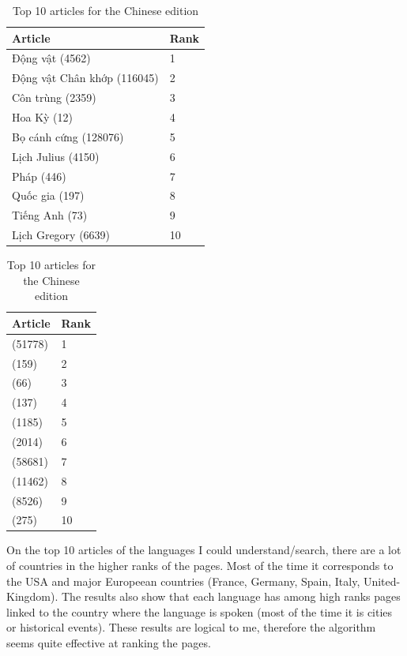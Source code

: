 \begin{table}[htbp]
    \begin{minipage}{.45\linewidth}
        \centering
        \begin{tabular}{ll}
            \toprule
            Article & Rank\\
            \midrule
            Động vật (4562) & 1\\
            Động vật Chân khớp (116045) & 2\\
            Côn trùng (2359) & 3\\
            Hoa Kỳ (12) & 4\\
            Bọ cánh cứng (128076) & 5\\
            Lịch Julius (4150) & 6\\
            Pháp (446) & 7\\
            Quốc gia (197) & 8\\
            Tiếng Anh (73) & 9\\
            Lịch Gregory (6639) & 10\\
            \bottomrule
        \end{tabular}
        \caption{Top 10 articles for the Vietnamese edition}
    \end{minipage}
    \hfill
    \begin{minipage}{.45\linewidth}
        \centering
        \begin{tabular}{ll}
            \toprule
            Article & Rank\\
            \midrule
            (51778) & 1\\
            (159) & 2\\
            (66) & 3\\
            (137) & 4\\
            (1185) & 5\\
            (2014) & 6\\
            (58681) & 7\\
            (11462) & 8\\
            (8526) & 9\\
            (275) & 10\\
            \bottomrule
        \end{tabular}
        \caption{Top 10 articles for the Chinese edition}
    \end{minipage}
\end{table}

\newpage
On the top 10 articles of the languages I could understand/search, there are a lot of countries in the higher ranks of the pages. Most of the time it corresponds to the USA and major Europeean countries (France, Germany, Spain, Italy, United-Kingdom). The results also show that each language has among high ranks pages linked to the country where the language is spoken (most of the time it is cities or historical events). These results are logical to me, therefore the algorithm seems quite effective at ranking the pages.
